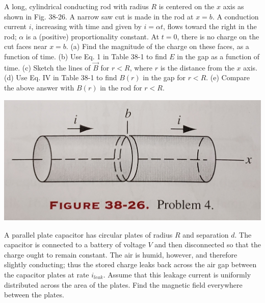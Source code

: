 \documentclass[11pt,letterpaper,boxed]{hmcpset}
\begin{document}
\begin{problem} [HRK P38.4] A long, cylindrical conducting rod with radius $R$ is centered on the $x$ axis as shown in Fig. 38-26. A narrow saw cut is made in the rod at $x=b$. A conduction current $i$, increasing with time and given by $i = \alpha t $, flows toward the right in the rod; $\alpha$ is a (positive) proportionality constant. At $t = 0$, there is no charge on the cut faces near $x=b$. (a) Find the magnitude of the charge on these faces, as a function of time. (b) Use Eq. 1 in Table 38-1 to find $E$ in the gap as a function of time. (c) Sketch the lines of $\vec{B}$ for $r < R$, where $r$ is the distance from the $x$ axis. (d) Use Eq. IV in Table 38-1 to find $B(r)$ in the gap for $r < R$. (e) Compare the above answer with $B(r)$ in the rod for $r < R$.
\begin{center}
    \includegraphics[scale = .075]{20191206_143840.jpg}
\end{center}
	\end{problem}
	\begin{solution}
		\vfill
	\end{solution}
	\newpage
	
\begin{problem} A parallel plate capacitor has circular plates of radius $R$ and separation $d$. The capacitor is
connected to a battery of voltage $V$ and then disconnected so that the charge ought to remain
constant. The air is humid, however, and therefore slightly conducting; thus the stored charge
leaks back across the air gap between the capacitor plates at rate $i_{leak}$. Assume that this leakage
current is uniformly distributed across the area of the plates. Find the magnetic field everywhere
between the plates.
	\end{problem}
	\begin{solution}
		\vfill
	\end{solution}
	\newpage
	
\end{document}
